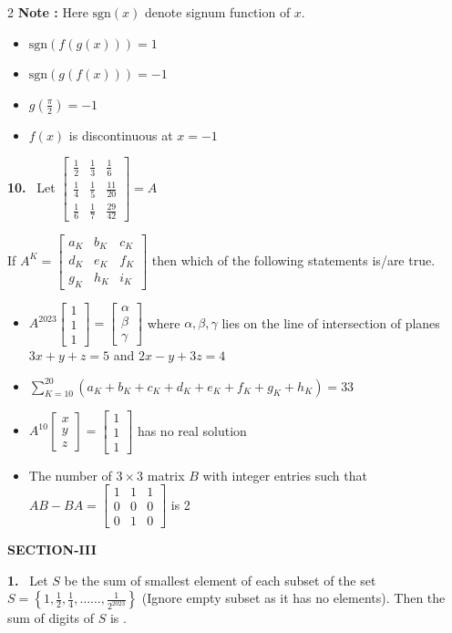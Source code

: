 \documentclass[10pt]{extarticle}
\newcommand{\sect}[1]{\par\smallskip\noindent\textbf{#1}\par}
\newcommand{\qn}[1]{\par\smallskip\noindent\textbf{#1.}~}
\newenvironment{qoptions}{\begin{itemize}[leftmargin=1.8em,itemsep=1pt,topsep=2pt,label={}]}{\end{itemize}}
\newcommand{\opt}[2]{\item[(#1)] #2}
\begin{document}
\begin{multicols}{2}
\textbf{Note :} Here $\mathrm{sgn}(x)$ denote signum function of $x$.
\begin{qoptions}
\opt{A}{$\mathrm{sgn}(f(g(x)))=1$}
\opt{B}{$\mathrm{sgn}(g(f(x)))=-1$}
\opt{C}{$g\left(\frac\pi2\right)=-1$}
\opt{D}{$f(x)$ is discontinuous at $x=-1$}
\end{qoptions}
\qn{10} Let $\begin{bmatrix}\frac12&\frac13&\frac16\\ \frac14&\frac15&\frac{11}{20}\\ \frac16&\frac17&\frac{29}{42}\end{bmatrix}=A$\par
If $A^K=\begin{bmatrix}a_K&b_K&c_K\\ d_K&e_K&f_K\\ g_K&h_K&i_K\end{bmatrix}$ then which of the following statements is/are true.
\begin{qoptions}
\opt{A}{$A^{2023}\begin{bmatrix}1\\1\\1\end{bmatrix}=\begin{bmatrix}\alpha\\\beta\\\gamma\end{bmatrix}$ where $\alpha,\beta,\gamma$ lies on the line of intersection of planes $3x+y+z=5$ and $2x-y+3z=4$}
\opt{B}{$\sum_{K=10}^{20}(a_K+b_K+c_K+d_K+e_K+f_K+g_K+h_K)=33$}
\opt{C}{$A^{10}\begin{bmatrix}x\\y\\z\end{bmatrix}=\begin{bmatrix}1\\1\\1\end{bmatrix}$ has no real solution}
\opt{D}{The number of $3\times3$ matrix $B$ with integer entries such that $AB-BA=\begin{bmatrix}1&1&1\\0&0&0\\0&1&0\end{bmatrix}$ is 2}
\end{qoptions}
\sect{SECTION-III}
\qn{1} Let $S$ be the sum of smallest element of each subset of the set $S=\left\{1,\frac12,\frac14,\ldots\ldots,\frac{1}{2^{2023}}\right\}$ (Ignore empty subset as it has no elements). Then the sum of digits of $S$ is \underline{\hspace{1cm}}.

\end{multicols}
\end{document}
